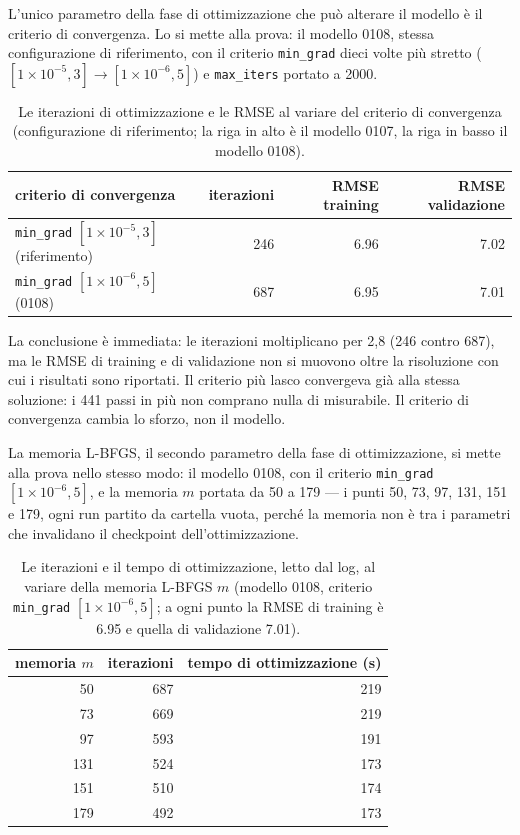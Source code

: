 L'unico parametro della fase di ottimizzazione che può alterare il
modello è il criterio di convergenza. Lo si mette alla prova: il
modello 0108, stessa configurazione di riferimento, con il criterio
\texttt{min\_grad} dieci volte più stretto
($[1\times10^{-5}, 3] \rightarrow [1\times10^{-6}, 5]$) e
\texttt{max\_iters} portato a 2000.

\begin{table}[ht]
\centering
\begin{tabular}{lrrr}
\toprule
criterio di convergenza & iterazioni & RMSE training & RMSE validazione \\
\midrule
\texttt{min\_grad} $[1\times10^{-5}, 3]$ (riferimento) & 246 & 6.96 & 7.02 \\
\texttt{min\_grad} $[1\times10^{-6}, 5]$ (0108) & 687 & 6.95 & 7.01 \\
\bottomrule
\end{tabular}
\caption{Le iterazioni di ottimizzazione e le RMSE al variare del
criterio di convergenza (configurazione di riferimento; la riga in
alto è il modello 0107, la riga in basso il modello 0108).}
\label{tab:min-grad}
\end{table}

La conclusione è immediata: le iterazioni moltiplicano per 2,8
(246 contro 687), ma le RMSE di training e di validazione non
si muovono oltre la risoluzione con cui i risultati sono riportati.
Il criterio più lasco convergeva già alla stessa soluzione: i 441
passi in più non comprano nulla di misurabile. Il criterio di
convergenza cambia lo sforzo, non il modello.

La memoria L-BFGS, il secondo parametro della fase di
ottimizzazione, si mette alla prova nello stesso modo: il modello
0108, con il criterio \texttt{min\_grad}
$[1\times10^{-6}, 5]$, e la memoria $m$ portata da 50 a 179 — i
punti 50, 73, 97, 131, 151 e 179, ogni run partito da cartella vuota,
perché la memoria non è tra i parametri che invalidano il
checkpoint dell'ottimizzazione.

\begin{table}[ht]
\centering
\begin{tabular}{rrr}
\toprule
memoria $m$ & iterazioni & tempo di ottimizzazione (s) \\
\midrule
50  & 687 & 219 \\
73  & 669 & 219 \\
97  & 593 & 191 \\
131 & 524 & 173 \\
151 & 510 & 174 \\
179 & 492 & 173 \\
\bottomrule
\end{tabular}
\caption{Le iterazioni e il tempo di ottimizzazione, letto dal log,
al variare della memoria L-BFGS $m$ (modello 0108, criterio
\texttt{min\_grad} $[1\times10^{-6}, 5]$; a ogni punto la RMSE di
training è 6.95 e quella di validazione 7.01).}
\label{tab:lbfgs-memoria}
\end{table}

